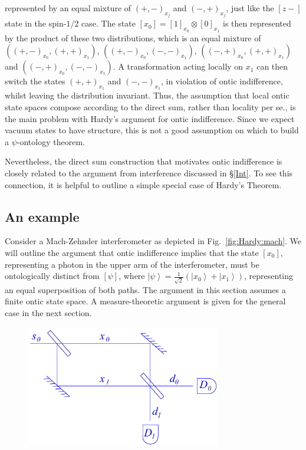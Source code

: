 \documentclass[DIV=calc,fontsize=12pt]{scrartcl} %
\theoremstyle{definition}
\theoremstyle{plain}
\newcommand{\Ket}[1]{\ensuremath{\left \vert #1 \right \rangle}}
\newcommand{\Proj}[1]{\ensuremath{\left [ #1 \right ]}}
\begin{document}
represented by an equal mixture of $(+,-)_{x_j}$ and $(-,+)_{x_j}$,
just like the $\Proj{z-}$ state in the spin-$1/2$ case.  The state
$\Proj{x_0} = \Proj{1}_{x_0} \otimes \Proj{0}_{x_1}$ is then
represented by the product of these two distributions, which is an
equal mixture of $((+,-)_{x_0},(+,+)_{x_1})$,
$((+,-)_{x_0},(-,-)_{x_1})$, $((-,+)_{x_0},(+,+)_{x_1})$ and
$((-,+)_{x_0},(-,-)_{x_1})$.  A transformation acting locally on $x_1$
can then switch the states $(+,+)_{x_1}$ and $(-,-)_{x_1}$, in
violation of ontic indifference, whilst leaving the distribution
invariant.  Thus, the assumption that local ontic state spaces compose
according to the direct sum, rather than locality per se., is the main
problem with Hardy's argument for ontic indifference.  Since we expect
vacuum states to have structure, this is not a good assumption on
which to build a $\psi$-ontology theorem.

Nevertheless, the direct sum construction that motivates ontic
indifference is closely related to the argument from interference
discussed in \S\ref{Int}.  To see this connection, it is helpful to
outline a simple special case of Hardy's Theorem.

\subsection{An example}

\label{HExa}

Consider a Mach-Zehnder interferometer as depicted in
Fig.~\ref{fig:Hardy:mach}.  We will outline the argument that ontic
indifference implies that the state $\Proj{x_0}$, representing a
photon in the upper arm of the interferometer, must be ontologically
distinct from $\Proj{\psi}$, where $\Ket{\psi} = \frac{1}{\sqrt{2}}
\left ( \Ket{x_0} + \Ket{x_1} \right )$, representing an equal
superposition of both paths.  The argument in this section assumes a
finite ontic state space.  A measure-theoretic argument is given for
the general case in the next section.

\begin{figure}[t!]
\centering
\includegraphics[width=85mm]{Fig13.pdf}
\caption{}
\end{figure}
\end{document}
